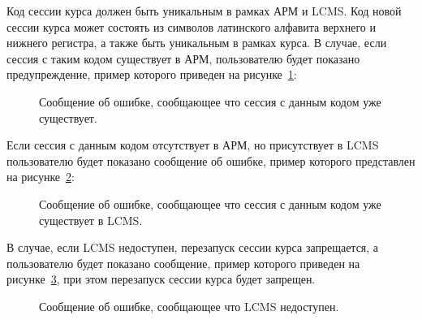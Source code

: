 Код сессии курса должен быть уникальным в рамках АРМ и LCMS.
Код новой сессии курса может состоять из символов латинского алфавита верхнего и нижнего регистра, а также быть уникальным в рамках курса.
В случае, если сессия с таким кодом существует в АРМ, пользователю будет показано предупреждение, пример которого приведен на рисунке~\ref{img:course_session:course_session_rerun_exists_error}:
\begin{figure}[H]
	\caption{Сообщение об ошибке, сообщающее что сессия с данным кодом уже существует.}
	\label{img:course_session:course_session_rerun_exists_error}
\end{figure}

Если сессия с данным кодом отсутствует в АРМ, но присутствует в LCMS пользователю будет показано сообщение об ошибке, пример которого представлен на рисунке~\ref{img:course_session:course_session_rerun_edx_exists_error}:
\begin{figure}[H]
	\caption{Сообщение об ошибке, сообщающее что сессия с данным кодом уже существует в LCMS.}
	\label{img:course_session:course_session_rerun_edx_exists_error}
\end{figure}

В случае, если LCMS недоступен, перезапуск сессии курса запрещается, а пользователю будет показано сообщение, пример которого приведен на рисунке~\ref{img:course_session:session_edx_disconnect}, при этом перезапуск сессии курса будет запрещен.

\begin{figure}[H]
	\caption{Сообщение об ошибке, сообщающее что LCMS недоступен.}
	\label{img:course_session:session_edx_disconnect}
\end{figure}

